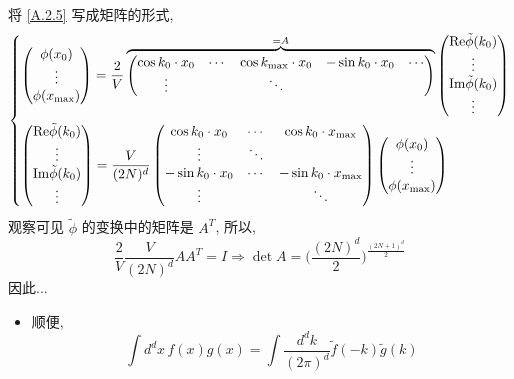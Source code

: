 \begin{itemize}
\begin{tcolorbox}[title=proof:]
		将 \eqref{A.2.5} 写成矩阵的形式,
		\begin{equation}
			\begin{dcases}
				\begin{pmatrix}
					\phi(x_0) \\
					\vdots \\
					\phi(x_{\max})
				\end{pmatrix} = \frac{2}{V} \overbrace{\begin{pmatrix}
					\cos k_0 \cdot x_0 & \cdots & \cos k_{\max} \cdot x_0 & - \sin k_0 \cdot x_0 & \cdots \\
					\vdots & & \ddots & &
				\end{pmatrix}}^{= A} \begin{pmatrix}
					\mathrm{Re} \tilde{\phi}(k_0) \\
					\vdots \\
					\mathrm{Im} \tilde{\phi}(k_0) \\
					\vdots
				\end{pmatrix} \\
				\begin{pmatrix}
					\mathrm{Re} \tilde{\phi}(k_0) \\
					\vdots \\
					\mathrm{Im} \tilde{\phi}(k_0) \\
					\vdots
				\end{pmatrix} = \frac{V}{(2 N)^d} \begin{pmatrix}
					\cos k_0 \cdot x_0 & \cdots & \cos k_0 \cdot x_{\max} \\
					\vdots & \ddots & \\
					- \sin k_0 \cdot x_0 & \cdots & - \sin k_0 \cdot x_{\max} \\
					\vdots & & \ddots
				\end{pmatrix} \begin{pmatrix}
					\phi(x_0) \\
					\vdots \\
					\phi(x_{\max})
				\end{pmatrix}
			\end{dcases}
		\end{equation}
		观察可见 $\tilde{\phi}$ 的变换中的矩阵是 $A^T$, 所以,
		\begin{equation}
			\frac{2}{V} \frac{V}{(2 N)^d} A A^T = I \Longrightarrow \det A = \Big( \frac{(2 N)^d}{2} \Big)^{\frac{(2 N + 1)^d}{2}}
		\end{equation}
		因此...
	\end{tcolorbox}
	
	\begin{itemize}
		\item 顺便,
		\begin{equation}
			\int d^d x \, f(x) g(x) = \int \frac{d^d k}{(2 \pi)^d} \tilde{f}(- k) \tilde{g}(k)
		\end{equation}
	\end{itemize}
\end{itemize}
